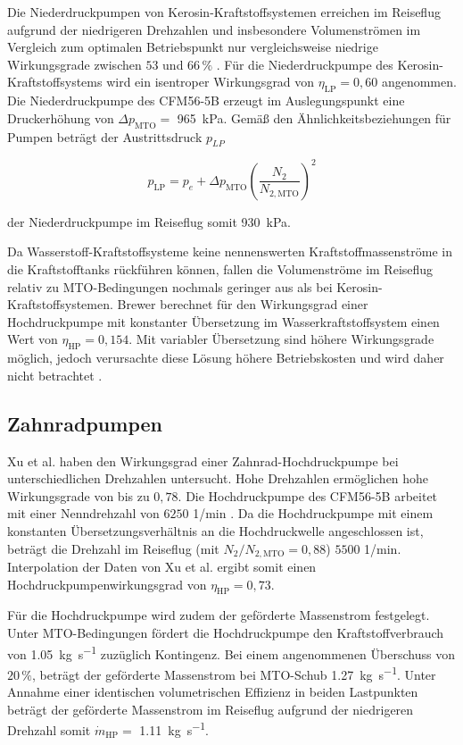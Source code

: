 Die Niederdruckpumpen von Kerosin-Kraftstoffsystemen erreichen im Reiseflug aufgrund der niedrigeren Drehzahlen und insbesondere Volumenströmen im Vergleich zum optimalen Betriebspunkt nur vergleichsweise niedrige Wirkungsgrade zwischen $53$ und $66\,\%$ \cite{Zhou.2023}. Für die Niederdruckpumpe des Kerosin-Kraftstoffsystems wird ein isentroper Wirkungsgrad von $\eta_{\mathrm{LP}}=0,60$ angenommen. Die Niederdruckpumpe des CFM56-5B erzeugt im Auslegungspunkt eine Druckerhöhung von $\Delta p_{\mathrm{MTO}}=$ \SI{965}{\kilo\Pa}. Gemäß den Ähnlichkeitsbeziehungen für Pumpen \cite{Gulich.2013} beträgt der Austrittsdruck $p_{LP}$ 

\begin{equation}\label{Eq:lpfp}
	p_{\mathrm{LP}}=p_e+\Delta p_{\mathrm{MTO}}\left(\frac{N_2}{N_{2,\mathrm{MTO}}}\right)^2
\end{equation}

der Niederdruckpumpe im Reiseflug somit \SI{930}{\kilo\Pa}.

Da Wasserstoff-Kraftstoffsysteme keine nennenswerten Kraftstoffmassenströme in die Kraftstofftanks rückführen können, fallen die Volumenströme im Reiseflug relativ zu MTO-Bedingungen nochmals geringer aus als bei Kerosin-Kraftstoffsystemen. Brewer \cite{Brewer.1991} berechnet für den Wirkungsgrad einer Hochdruckpumpe mit konstanter Übersetzung im Wasserkraftstoffsystem einen Wert von $\eta_{\mathrm{HP}}=0,154$. Mit variabler Übersetzung sind höhere Wirkungsgrade möglich, jedoch verursachte diese Lösung höhere Betriebskosten und wird daher nicht betrachtet \cite{Brewer.1991}. 

\subsection{Zahnradpumpen}

Xu et al. \cite{Xu.2024} haben den Wirkungsgrad einer Zahnrad-Hochdruckpumpe bei unterschiedlichen Drehzahlen untersucht. Hohe Drehzahlen ermöglichen hohe Wirkungsgrade von bis zu $0,78$. Die Hochdruckpumpe des CFM56-5B arbeitet mit einer Nenndrehzahl von $6250$ 1/min \cite{EatonFuelSystemsDivision.2008}. Da die Hochdruckpumpe mit einem konstanten Übersetzungsverhältnis an die Hochdruckwelle angeschlossen ist, beträgt die Drehzahl im Reiseflug (mit $N_2/N_{2,\mathrm{MTO}}=0,88$) $5500$ 1/min. Interpolation der Daten von Xu et al. \cite{Xu.2024} ergibt somit einen Hochdruckpumpenwirkungsgrad von $\eta_{\mathrm{HP}}=0,73$.

Für die Hochdruckpumpe wird zudem der geförderte Massenstrom festgelegt. Unter MTO-Bedingungen fördert die Hochdruckpumpe den Kraftstoffverbrauch von \SI{1.05}{\kg\per\s} zuzüglich Kontingenz. Bei einem angenommenen Überschuss von $20\,\%$, beträgt der geförderte Massenstrom bei MTO-Schub \SI{1.27}{\kg\per\s}. Unter Annahme einer identischen volumetrischen Effizienz in beiden Lastpunkten beträgt der geförderte Massenstrom im Reiseflug aufgrund der niedrigeren Drehzahl somit $\dot{m}_\mathrm{HP}=$ \SI{1.11}{\kg\per\s}.

